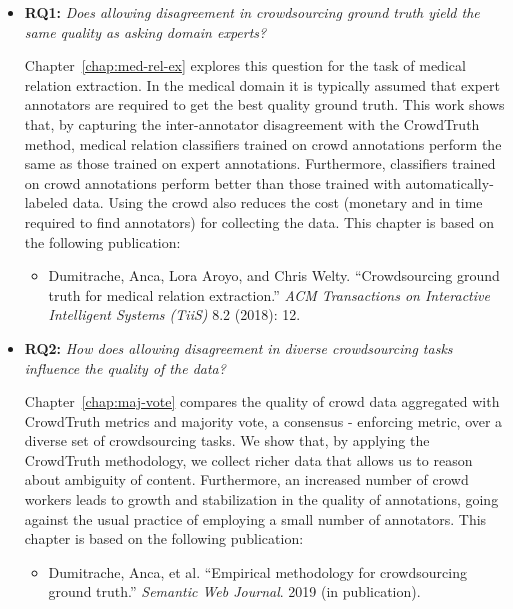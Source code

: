 \begin{itemize}
    \item \textbf{RQ1:} \textit{Does allowing disagreement in crowdsourcing ground truth yield the same quality as asking domain experts?}
    
    Chapter~\ref{chap:med-rel-ex} explores this question for the task of medical relation extraction. In the medical domain it is typically assumed that expert annotators are required to get the best quality ground truth. This work shows that, by capturing the inter-annotator disagreement with the CrowdTruth method, medical relation classifiers trained on crowd annotations perform the same as those trained on expert annotations. Furthermore, classifiers trained on crowd annotations perform better than those trained with automatically-labeled data. Using the crowd also reduces the cost (monetary and in time required to find annotators) for collecting the data. This chapter is based on the following publication:
    
    \begin{itemize}
        \item Dumitrache, Anca, Lora Aroyo, and Chris Welty. ``Crowdsourcing ground truth for medical relation extraction.'' \textit{ACM Transactions on Interactive Intelligent Systems (TiiS)} 8.2 (2018): 12.~\cite{DBLP:journals/corr/DumitracheAW17}
    \end{itemize}

    \item \textbf{RQ2:} \textit{How does allowing disagreement in diverse crowdsourcing tasks influence the quality of the data?}
    
    Chapter~\ref{chap:maj-vote} compares the quality of crowd data aggregated with CrowdTruth metrics and majority vote, a consensus - enforcing metric, over a diverse set of crowdsourcing tasks. We show that, by applying the CrowdTruth methodology, we collect richer data that allows us to reason about ambiguity of content. Furthermore, an increased number of crowd workers leads to growth and stabilization in the quality of annotations, going against the usual practice of employing a small number of annotators. This chapter is based on the following publication:
    
    \begin{itemize}
        \item Dumitrache, Anca, et al. ``Empirical methodology for crowdsourcing ground truth.'' \textit{Semantic Web Journal}. 2019 (in publication).~\cite{dumitracheempirical}
    \end{itemize}


\end{itemize}
